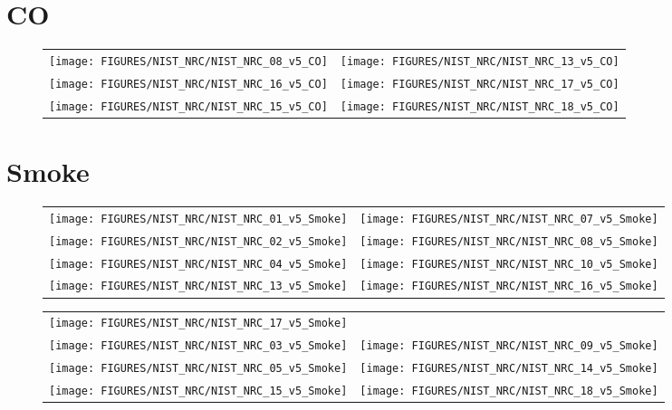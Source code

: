 \clearpage



\section{CO}

\begin{figure}[h]
\begin{tabular*}{\textwidth}{l@{\extracolsep{\fill}}r}
\texttt{[image: FIGURES/NIST\_NRC/NIST\_NRC\_08\_v5\_CO]} &
\texttt{[image: FIGURES/NIST\_NRC/NIST\_NRC\_13\_v5\_CO]} \\
\texttt{[image: FIGURES/NIST\_NRC/NIST\_NRC\_16\_v5\_CO]} &
\texttt{[image: FIGURES/NIST\_NRC/NIST\_NRC\_17\_v5\_CO]} \\
\texttt{[image: FIGURES/NIST\_NRC/NIST\_NRC\_15\_v5\_CO]} &
\texttt{[image: FIGURES/NIST\_NRC/NIST\_NRC\_18\_v5\_CO]} \\
\end{tabular*}
\end{figure}


\clearpage


\section{Smoke}

\begin{figure}[h]
\begin{tabular*}{\textwidth}{l@{\extracolsep{\fill}}r}
\texttt{[image: FIGURES/NIST\_NRC/NIST\_NRC\_01\_v5\_Smoke]} &
\texttt{[image: FIGURES/NIST\_NRC/NIST\_NRC\_07\_v5\_Smoke]} \\
\texttt{[image: FIGURES/NIST\_NRC/NIST\_NRC\_02\_v5\_Smoke]} &
\texttt{[image: FIGURES/NIST\_NRC/NIST\_NRC\_08\_v5\_Smoke]} \\
\texttt{[image: FIGURES/NIST\_NRC/NIST\_NRC\_04\_v5\_Smoke]} &
\texttt{[image: FIGURES/NIST\_NRC/NIST\_NRC\_10\_v5\_Smoke]} \\
\texttt{[image: FIGURES/NIST\_NRC/NIST\_NRC\_13\_v5\_Smoke]} &
\texttt{[image: FIGURES/NIST\_NRC/NIST\_NRC\_16\_v5\_Smoke]}
\end{tabular*}
\end{figure}

\begin{figure}[p]
\begin{tabular*}{\textwidth}{l@{\extracolsep{\fill}}r}
\texttt{[image: FIGURES/NIST\_NRC/NIST\_NRC\_17\_v5\_Smoke]} &
 \\
\texttt{[image: FIGURES/NIST\_NRC/NIST\_NRC\_03\_v5\_Smoke]} &
\texttt{[image: FIGURES/NIST\_NRC/NIST\_NRC\_09\_v5\_Smoke]} \\
\texttt{[image: FIGURES/NIST\_NRC/NIST\_NRC\_05\_v5\_Smoke]} &
\texttt{[image: FIGURES/NIST\_NRC/NIST\_NRC\_14\_v5\_Smoke]} \\
\texttt{[image: FIGURES/NIST\_NRC/NIST\_NRC\_15\_v5\_Smoke]} &
\texttt{[image: FIGURES/NIST\_NRC/NIST\_NRC\_18\_v5\_Smoke]}
\end{tabular*}
\end{figure}

